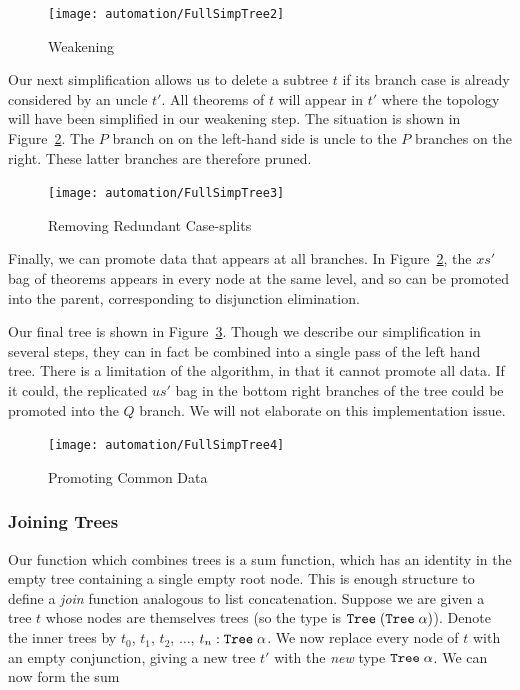 \begin{figure}
\centering\texttt{[image: automation/FullSimpTree2]}
\caption{Weakening}
\label{fig:TreeWeakening}
\end{figure}

Our next simplification allows us to delete a subtree $t$ if its branch case is already considered by an uncle $t'$. All theorems of $t$ will appear in $t'$ where the topology will have been simplified in our weakening step. The situation is shown in Figure~\ref{fig:TreeRedundantSplits}. The $P$ branch on on the left-hand side is uncle to the $P$ branches on the right. These latter branches are therefore pruned.

\begin{figure}
\centering\texttt{[image: automation/FullSimpTree3]}
\caption{Removing Redundant Case-splits}
\label{fig:TreeRedundantSplits}
\end{figure}

Finally, we can promote data that appears at all branches. In Figure~\ref{fig:TreeRedundantSplits}, the $xs'$ bag of theorems appears in every node at the same level, and so can be promoted into the parent, corresponding to disjunction elimination. 

Our final tree is shown in Figure~\ref{fig:TreePromoting}. Though we describe our simplification in several steps, they can in fact be combined into a single pass of the left hand tree. There is a limitation of the algorithm, in that it cannot promote all data. If it could, the replicated $us'$ bag in the bottom right branches of the tree could be promoted into the $Q$ branch. We will not elaborate on this implementation issue.

\begin{figure}
\centering\texttt{[image: automation/FullSimpTree4]}
\caption{Promoting Common Data}
\label{fig:TreePromoting}
\end{figure}

\subsubsection{Joining Trees}
Our function which combines trees is a sum function, which has an identity in the empty tree containing a single empty root node. This is enough structure to define a \emph{join} function analogous to list concatenation. Suppose we are given a tree $t$ whose nodes are themselves trees (so the type is $\texttt{Tree}\;(\texttt{Tree}\; \alpha)$). Denote the inner trees by $t_0$, $t_1$, $t_2$, $\ldots$, $t_n : \texttt{Tree}\;\alpha$. We now replace every node of $t$ with an empty conjunction, giving a new tree $t'$ with the \emph{new} type $\texttt{Tree}\;\alpha$. We can now form the sum 

